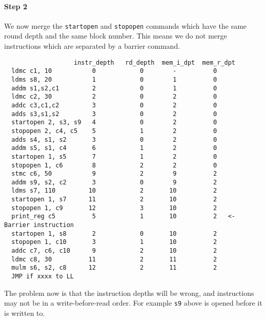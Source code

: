 \paragraph{Step 2}
We now merge the \verb+startopen+ and \verb+stopopen+ commands
which have the same round depth and the same block number.
This means we do not merge instructions which are
separated by a barrier command.
\begin{verbatim}
                   instr_depth   rd_depth  mem_i_dpt  mem_r_dpt
  ldmc c1, 10           0            0        -          0
  ldms s8, 20           1            0        1          0
  addm s1,s2,c1         2            0        1          0
  ldmc c2, 30           2            0        2          0
  addc c3,c1,c2         3            0        2          0
  adds s3,s1,s2         3            0        2          0
  startopen 2, s3, s9   4            0        2          0
  stopopen 2, c4, c5    5            1        2          0
  adds s4, s1, s2       3            0        2          0
  addm s5, s1, c4       6            1        2          0
  startopen 1, s5       7            1        2          0
  stopopen 1, c6        8            2        2          0
  stmc c6, 50           9            2        9          2
  addm s9, s2, c2       3            0        9          2
  ldms s7, 110         10            2       10          2
  startopen 1, s7      11            2       10          2
  stopopen 1, c9       12            3       10          2
  print_reg c5          5            1       10          2   <- Barrier instruction
  startopen 1, s8       2            0       10          2
  stopopen 1, c10       3            1       10          2
  addc c7, c6, c10      9            2       10          2
  ldmc c8, 30          11            2       11          2
  mulm s6, s2, c8      12            2       11          2
  JMP if xxxx to LL
\end{verbatim}
The problem now is that the instruction depths will be wrong,
and instructions may not be in a write-before-read order.
For example \verb+s9+ above is opened before it is written to.

